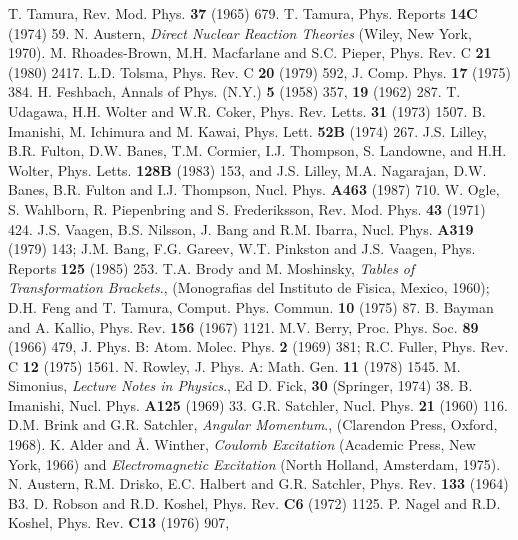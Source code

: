 \documentclass[11pt,a4paper]{article}
\begin{document}
\begin{thebibliography}{99}
\itemsep=-2pt
T. Tamura, Rev. Mod. Phys. {\bf 37} (1965) 679.
T. Tamura, Phys. Reports {\bf 14C} (1974) 59.
N. Austern, {\em Direct Nuclear Reaction Theories} (Wiley, New York, 1970).
M. Rhoades-Brown, M.H. Macfarlane and S.C. Pieper, Phys. Rev. C {\bf 21} (1980) 2417.
L.D. Tolsma, Phys. Rev. C {\bf 20} (1979) 592, J. Comp. Phys. {\bf 17} (1975) 384.
H. Feshbach, Annals of Phys. (N.Y.) {\bf 5} (1958) 357, {\bf 19} (1962) 287.
T. Udagawa, H.H. Wolter and W.R. Coker, Phys. Rev. Letts.
{\bf 31} (1973) 1507.
B. Imanishi, M. Ichimura and M. Kawai, Phys. Lett. {\bf 52B} (1974) 267.
J.S. Lilley, B.R. Fulton, D.W. Banes, T.M. Cormier, I.J. Thompson, S. Landowne,
and H.H. Wolter, Phys. Letts. {\bf 128B} (1983) 153, and
J.S. Lilley, M.A. Nagarajan, D.W. Banes, B.R. Fulton and I.J. Thompson,
Nucl. Phys. {\bf A463} (1987) 710.
W. Ogle, S. Wahlborn, R. Piepenbring and S. Frederiksson, Rev. Mod. Phys.
{\bf 43} (1971) 424.
J.S. Vaagen, B.S. Nilsson, J. Bang and R.M. Ibarra,
Nucl. Phys. {\bf A319} (1979) 143;
J.M. Bang, F.G. Gareev, W.T. Pinkston and J.S. Vaagen, Phys. Reports
{\bf 125} (1985) 253.
T.A. Brody and M. Moshinsky, {\em Tables of Transformation Brackets}.,
(Monografias del Instituto de Fisica, Mexico, 1960);
D.H. Feng and T. Tamura, Comput. Phys. Commun. {\bf 10} (1975) 87.
B. Bayman and A. Kallio, Phys. Rev. {\bf 156} (1967) 1121.
M.V. Berry, Proc. Phys. Soc. {\bf 89} (1966) 479,
J. Phys. B: Atom. Molec. Phys. {\bf 2} (1969) 381;
R.C. Fuller, Phys. Rev. C {\bf 12} (1975) 1561.
N. Rowley, J. Phys. A: Math. Gen. {\bf 11} (1978) 1545.
M. Simonius, {\em Lecture Notes in Physics}.,
Ed D. Fick, {\bf 30} (Springer, 1974) 38.
B. Imanishi, Nucl. Phys. {\bf A125} (1969) 33.
G.R. Satchler, Nucl. Phys. {\bf 21} (1960) 116.
D.M. Brink and G.R. Satchler, {\em Angular Momentum}.,
(Clarendon Press, Oxford, 1968).
K. Alder and \AA. Winther, {\em Coulomb Excitation}
(Academic Press, New York, 1966)
and {\em Electromagnetic Excitation} (North Holland, Amsterdam, 1975).
N. Austern, R.M. Drisko, E.C. Halbert and G.R. Satchler, Phys. Rev.
{\bf 133} (1964) B3.
D. Robson and R.D. Koshel, Phys. Rev. {\bf C6} (1972) 1125.
P. Nagel and R.D. Koshel, Phys. Rev. {\bf C13} (1976) 907,

\end{thebibliography}
\end{document}
